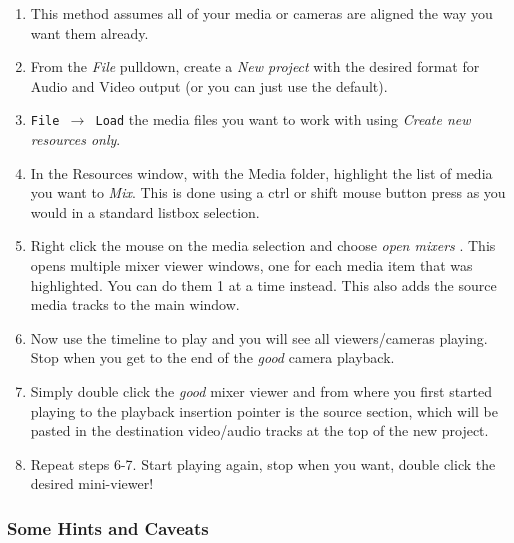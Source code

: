 \begin{enumerate}
	\item This method assumes all of your media or cameras are aligned the way you want them already.
	\item From the \textit{File} pulldown, create a \textit{New project} with the desired format for Audio and Video output (or you can just use the default).
	\item \texttt{File $\rightarrow$ Load} the media files you want to work with using \textit{Create new resources only}.
	\item In the Resources window, with  the Media folder, highlight the list of media you want to \textit{Mix}. This is done using a ctrl or shift mouse button press as you would in a standard listbox selection.
	\item Right click the mouse on the media selection and choose \textit{open mixers} . This opens multiple mixer viewer  windows, one for each media item that was highlighted.  You can
	do them 1 at a time instead.  This also adds the source media tracks to the main window.
	\item Now use the timeline  to play and you will see all viewers/cameras playing.  Stop when you get to the
	end of the \textit{good} camera playback.
	\item Simply double click the \textit{good} mixer viewer and from where you first started playing to the playback insertion pointer is the source section, which will be pasted in the destination video/audio tracks at the top of the new project.
	\item Repeat steps 6-7.  Start playing again, stop when you want, double click the desired mini-viewer!
\end{enumerate}

\subsubsection*{Some Hints and Caveats}%
\label{ssub:hints_caveats}

